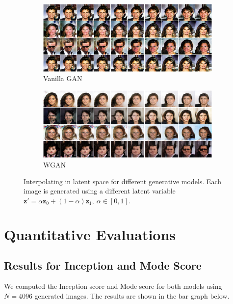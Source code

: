 \documentclass[table]{article}
\def\*#1{\mathbf{#1}}
\begin{document}
\begin{figure}[ht]
  \centering
  \begin{subfigure}{\textwidth}
    \centering
    \includegraphics[scale=0.5]{imgs/gan_latent_lerp}
    \caption{Vanilla GAN}
  \end{subfigure}

  \vspace*{3mm}
  \begin{subfigure}{\textwidth}
    \centering
    \includegraphics[scale=0.5]{imgs/wgan_latent_lerp}
    \caption{WGAN}
  \end{subfigure}
  \caption{Interpolating in latent space for different generative models. Each image is generated using a different latent variable $\*z' = \alpha \*z_0 + (1-\alpha)\*z_1, \ \alpha \in [0,1]$.}
  \label{latent_lerp}
\end{figure}

\newpage
\section{Quantitative Evaluations}
\subsection{Results for Inception and Mode Score}
We computed the Inception score and Mode score for both models using $N=4096$ generated images. The results are shown in the bar graph below.
\end{document}
